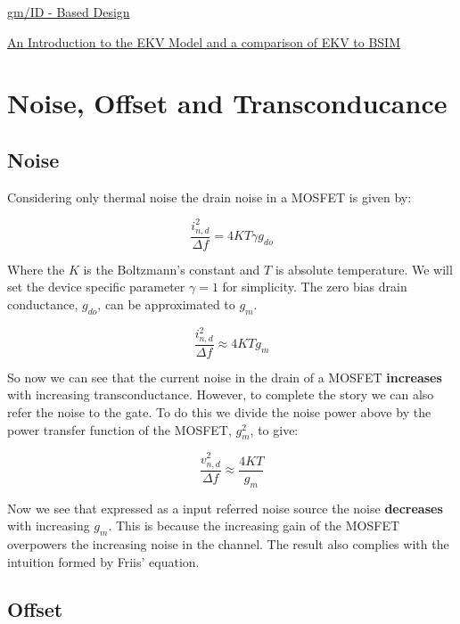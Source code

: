 \documentclass[11pt]{article}
\begin{document}
\hspace{1cm} \href{http://web02.gonzaga.edu/faculty/talarico/EE406/documents/gmid.pdf}{gm/ID - Based Design}

\hspace{1cm} \href{http://web.eecs.utk.edu/~bblalock/ece532/ece532_pres_ekv_bsim.pdf}{An Introduction to the EKV Model and a comparison of EKV to BSIM}

\newpage
\section{Noise, Offset and Transconducance}

\subsection{Noise}

Considering only thermal noise the drain noise in a MOSFET is given by:

\begin{equation}
\frac{i^2_{n,d}}{\Delta f} = 4 K T \gamma g_{do}
\end{equation}

Where the $ K $ is the Boltzmann's constant and $T$ is absolute temperature. We will set the device specific parameter $\gamma=1$ for simplicity. The zero bias drain conductance, $g_{do}$, can be approximated to $ g_m $.

\begin{equation}
\frac{i^2_{n,d}}{\Delta f} \approx 4 K T g_{m}
\end{equation}

So now we can see that the current noise in the drain of a MOSFET \textbf{increases} with increasing transconductance. However, to complete the story we can also refer the noise to the gate. To do this we divide the noise power above by the power transfer function of the MOSFET, $g^2_{m}$, to give:

\begin{equation}
\frac{v^2_{n,d}}{\Delta f} \approx \frac{4 K T}{ g_{m} }
\end{equation}

Now we see that expressed as a input referred noise source the noise \textbf{decreases} with increasing $g_{m}$. This is because the increasing gain of the MOSFET overpowers the increasing noise in the channel. The result also complies with the intuition formed by Friis' equation.


\subsection{Offset}
\end{document}
